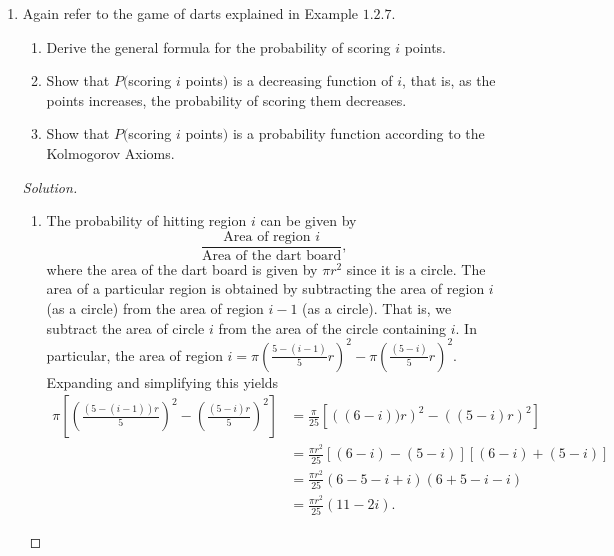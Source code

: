 \documentclass[12pt]{article}
\theoremstyle{definition}
\theoremstyle{plain}
\newenvironment{solution}
  {\begin{proof}[Solution]}
  {\end{proof}}
\begin{document}
\begin{enumerate}
\begin{solution}
\begin{enumerate}
	\item If at most one of $ A $ or $ B $ occurs, it follows that $ A $ and $ B $ do not occur simultaneously. That is, the event we consider is $ (A \cap B)^c  $. The probability is given as $ P((A \cap B)^c) = 1 - P(A \cap B) $.
	\end{enumerate}
	\end{solution}
	
\setcounter{enumi}{7}
\item Again refer to the game of darts explained in Example $ 1.2.7 $.
	\begin{enumerate}
	\item Derive the general formula for the probability of scoring $ i $ points.
	\item Show that $ P( $scoring $ i $ points$ ) $ is a decreasing function of $ i $, that is, as the points increases, the probability of scoring them decreases.
	\item Show that $ P( $scoring $ i $ points$ ) $ is a probability function according to the Kolmogorov Axioms.
	\end{enumerate}
	
	\begin{solution}
	\begin{enumerate}
	\item The probability of hitting region $ i $ can be given by 
		\[ \frac{\text{Area of region } i}{\text{Area of the dart board}}, \]
		where the area of the dart board is given by $ \pi r^2 $ since it is a circle. The area of a particular region is obtained by subtracting the area of region $ i $ (as a circle) from the area of region $ i - 1 $ (as a circle). That is, we subtract the area of circle $ i $ from the area of the circle containing $ i $. In particular, the area of region $ i = \pi (\frac{5 - (i - 1)}{5} r)^2 - \pi (\frac{(5 - i)}{5} r)^2 $. Expanding and simplifying this yields
		\begin{align*}
			\pi \left [ \left (\frac{(5 - (i-1)) r}{5} \right)^2 - \left ( \frac{(5 - i)r}{5} \right )^2 \right] &= \frac{\pi}{25}\left[ \left ( (6 - i))r \right)^2 - \left( (5 - i)r \right)^2 \right] \\
			&= \frac{\pi r^2}{25} \left [ (6 - i) - (5 - i) \right] \left[ (6 - i) + (5 - i) \right]\\
			&= \frac{\pi r^2}{25} (6 - 5 - i + i)(6 + 5 - i - i)\\
			&= \frac{\pi r^2}{25} (11 - 2i).
		\end{align*}
		

\end{enumerate}
\end{solution}
\end{enumerate}
\end{document}
